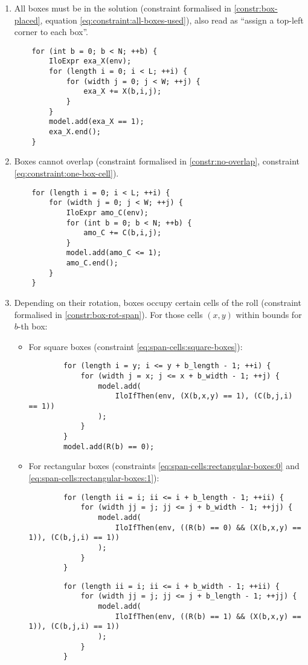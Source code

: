 \begin{enumerate}
	\item All boxes must be in the solution (constraint formalised in
	\ref{constr:box-placed}, equation \ref{eq:constraint:all-boxes-used}),
	also read as ``assign a top-left corner to each box''.
    
	{\NOINDENT \begin{lstlisting}
	for (int b = 0; b < N; ++b) {
		IloExpr exa_X(env);
		for (length i = 0; i < L; ++i) {
			for (width j = 0; j < W; ++j) {
				exa_X += X(b,i,j);
			}
		}
		model.add(exa_X == 1);
		exa_X.end();
	}
	\end{lstlisting}}
    
	\item Boxes cannot overlap (constraint formalised in
	\ref{constr:no-overlap}, constraint \ref{eq:constraint:one-box-cell}).
    
	{\NOINDENT \begin{lstlisting}
	for (length i = 0; i < L; ++i) {
		for (width j = 0; j < W; ++j) {
			IloExpr amo_C(env);
			for (int b = 0; b < N; ++b) {
				amo_C += C(b,i,j);
			}
			model.add(amo_C <= 1);
			amo_C.end();
		}
	}
	\end{lstlisting}}
    
	\item Depending on their rotation, boxes occupy certain cells of the roll
	(constraint formalised in \ref{constr:box-rot-span}). For those cells $(x,y)$ within
	bounds for $b$-th box:

	\begin{itemize}
		\item For square boxes (constraint \ref{eq:span-cells:square-boxes}):
		{\NOINDENT \begin{lstlisting}
		for (length i = y; i <= y + b_length - 1; ++i) {
			for (width j = x; j <= x + b_width - 1; ++j) {
				model.add(
					IloIfThen(env, (X(b,x,y) == 1), (C(b,j,i) == 1))
				);
			}
		}
		model.add(R(b) == 0);
		\end{lstlisting}}
		
		\item For rectangular boxes (constraints \ref{eq:span-cells:rectangular-boxes:0} and
		\ref{eq:span-cells:rectangular-boxes:1}):
		{\NOINDENT \begin{lstlisting}
		for (length ii = i; ii <= i + b_length - 1; ++ii) {
			for (width jj = j; jj <= j + b_width - 1; ++jj) {
				model.add(
					IloIfThen(env, ((R(b) == 0) && (X(b,x,y) == 1)), (C(b,j,i) == 1))
				);
			}
		}
		\end{lstlisting}}
		{\NOINDENT \begin{lstlisting}
		for (length ii = i; ii <= i + b_width - 1; ++ii) {
			for (width jj = j; jj <= j + b_length - 1; ++jj) {
				model.add(
					IloIfThen(env, ((R(b) == 1) && (X(b,x,y) == 1)), (C(b,j,i) == 1))
				);
			}
		}
		\end{lstlisting}}
	\end{itemize}
    

\end{enumerate}
